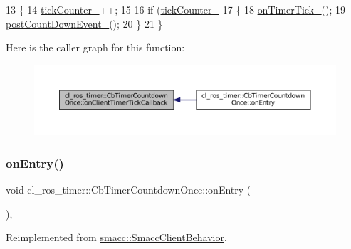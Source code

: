 \begin{DoxyCode}
13 \{
14     \hyperlink{classcl__ros__timer_1_1CbTimerCountdownOnce_aea7372342782a0b6a1ba50b07ccb0962}{tickCounter\_}++;
15 
16     \textcolor{keywordflow}{if} (\hyperlink{classcl__ros__timer_1_1CbTimerCountdownOnce_aea7372342782a0b6a1ba50b07ccb0962}{tickCounter\_} %
17     \{
18         \hyperlink{classcl__ros__timer_1_1CbTimerCountdownOnce_ac948b5efd5c9a397319668378463eadd}{onTimerTick\_}();
19         \hyperlink{classcl__ros__timer_1_1CbTimerCountdownOnce_a5ab3b0a0aa38f28bc3091583d30fe003}{postCountDownEvent\_}();
20     \}
21 \}
\end{DoxyCode}
Here is the caller graph for this function\+:
\nopagebreak
\begin{figure}[H]
\begin{center}
\leavevmode
\includegraphics[width=350pt]{classcl__ros__timer_1_1CbTimerCountdownOnce_a2b02bbde9c9321781b70b9371b22673a_icgraph}
\end{center}
\end{figure}
\mbox{\label{classcl__ros__timer_1_1CbTimerCountdownOnce_a613662c4a4106ece0ce1dee198d1aba2}} 
\subsubsection{\texorpdfstring{on\+Entry()}{onEntry()}}
{\footnotesize\ttfamily void cl\+\_\+ros\+\_\+timer\+::\+Cb\+Timer\+Countdown\+Once\+::on\+Entry (\begin{DoxyParamCaption}{ }\end{DoxyParamCaption})\hspace{0.3cm}{\ttfamily [override]}, {\ttfamily [virtual]}}



Reimplemented from \hyperlink{classsmacc_1_1SmaccClientBehavior_a7962382f93987c720ad432fef55b123f}{smacc\+::\+Smacc\+Client\+Behavior}.



